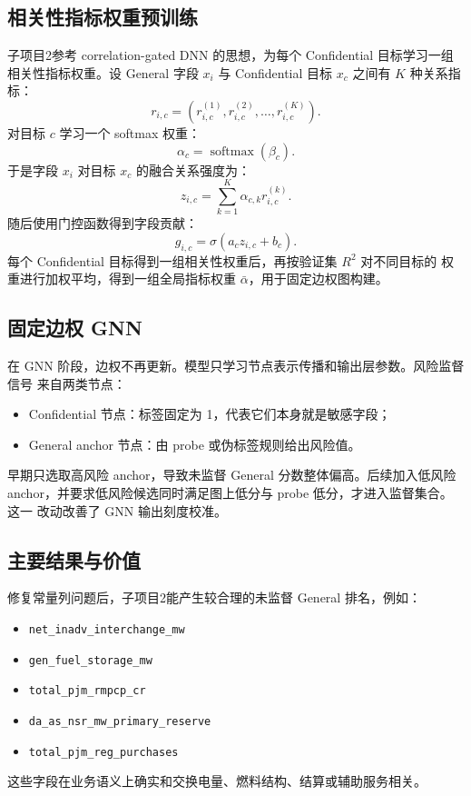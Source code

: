 \documentclass[UTF8,a4paper,11pt]{ctexart}
\begin{document}
\subsection{相关性指标权重预训练}

子项目2参考 correlation-gated DNN 的思想，为每个 Confidential 目标学习一组
相关性指标权重。设 General 字段 $x_i$ 与 Confidential 目标 $x_c$ 之间有
$K$ 种关系指标：
\[
  r_{i,c} = \left(r_{i,c}^{(1)}, r_{i,c}^{(2)}, \ldots, r_{i,c}^{(K)}\right).
\]
对目标 $c$ 学习一个 softmax 权重：
\[
  \alpha_c = \operatorname{softmax}(\beta_c).
\]
于是字段 $x_i$ 对目标 $x_c$ 的融合关系强度为：
\[
  z_{i,c} = \sum_{k=1}^{K} \alpha_{c,k} r_{i,c}^{(k)}.
\]
随后使用门控函数得到字段贡献：
\[
  g_{i,c} = \sigma(a_c z_{i,c} + b_c).
\]
每个 Confidential 目标得到一组相关性权重后，再按验证集 $R^2$ 对不同目标的
权重进行加权平均，得到一组全局指标权重 $\bar{\alpha}$，用于固定边权图构建。

\subsection{固定边权 GNN}

在 GNN 阶段，边权不再更新。模型只学习节点表示传播和输出层参数。风险监督信号
来自两类节点：
\begin{itemize}
  \item Confidential 节点：标签固定为 1，代表它们本身就是敏感字段；
  \item General anchor 节点：由 probe 或伪标签规则给出风险值。
\end{itemize}

早期只选取高风险 anchor，导致未监督 General 分数整体偏高。后续加入低风险
anchor，并要求低风险候选同时满足图上低分与 probe 低分，才进入监督集合。这一
改动改善了 GNN 输出刻度校准。

\subsection{主要结果与价值}

修复常量列问题后，子项目2能产生较合理的未监督 General 排名，例如：
\begin{itemize}
  \item \texttt{net\_inadv\_interchange\_mw}
  \item \texttt{gen\_fuel\_storage\_mw}
  \item \texttt{total\_pjm\_rmpcp\_cr}
  \item \texttt{da\_as\_nsr\_mw\_primary\_reserve}
  \item \texttt{total\_pjm\_reg\_purchases}
\end{itemize}
这些字段在业务语义上确实和交换电量、燃料结构、结算或辅助服务相关。
\end{document}
